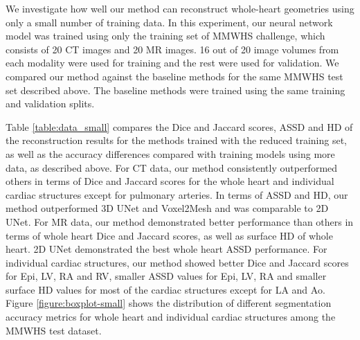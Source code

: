 \documentclass[times,review,preprint,authoryear]{elsarticle}
\begin{document}
We investigate how well our method can reconstruct whole-heart geometries using only a small number of training data. In this experiment,  our neural network model was trained using only the training set of MMWHS challenge, which consists of 20 CT images and 20 MR images. 16 out of 20 image volumes from each modality were used for training and the rest were used for validation. We compared our method against the baseline methods for the same MMWHS test set described above. The baseline methods were trained using the same training and validation splits. 

Table \ref{table:data_small} compares the Dice and Jaccard scores, ASSD and HD of the reconstruction results for the methods trained with the reduced training set, as well as the accuracy differences compared with training models using more data, as described above. For CT data, our method consistently outperformed others in terms of Dice and Jaccard scores for the whole heart and individual cardiac structures except for pulmonary arteries. In terms of ASSD and HD, our method outperformed 3D UNet and Voxel2Mesh and was comparable to 2D UNet. For MR data, our method demonstrated better performance than others in terms of whole heart Dice and Jaccard scores, as well as surface HD of whole heart. 2D UNet demonstrated the best whole heart ASSD performance. For individual cardiac structures, our method showed better Dice and Jaccard scores for Epi, LV, RA and RV, smaller ASSD values for Epi, LV, RA and smaller surface HD values for most of the cardiac structures except for LA and Ao. Figure \ref{figure:boxplot-small} shows the distribution of different segmentation accuracy metrics for whole heart and individual cardiac structures among the MMWHS test dataset. 
\end{document}

